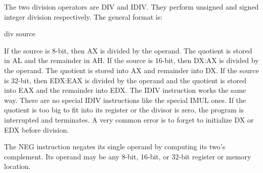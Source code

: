 The two division operators are {\code DIV} and {\code IDIV}. They perform
unsigned and signed integer division respectively. The general format is:
\begin{AsmCodeListing}[numbers=none,frame=none]
      div   source
\end{AsmCodeListing}
If the source is 8-bit, then AX is divided by the operand. The
quotient is stored in AL and the remainder in AH. If the source is
16-bit, then DX:AX is divided by the operand. The quotient is stored
into AX and remainder into DX. If the source is 32-bit, then
EDX:EAX is divided by the operand and the quotient is
stored into EAX and the remainder into EDX. The {\code IDIV}
 instruction works the same way. There are no special
{\code IDIV} instructions like the special {\code IMUL} ones. If the
quotient is too big to fit into its register or the divisor is zero,
the program is interrupted and terminates. A very common error is to
forget to initialize DX or EDX before division.

The {\code NEG}  instruction negates its single operand by computing
its two's complement. Its operand may be any 8-bit, 16-bit, or 32-bit
register or memory location.

